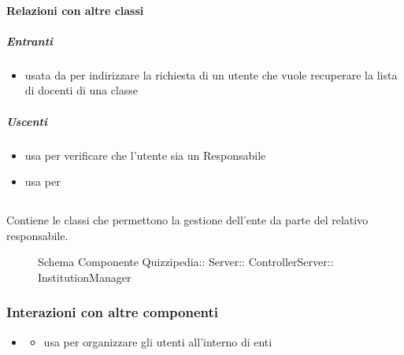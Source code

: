 \paragraph{Relazioni con altre classi}
\subparagraph{Entranti}
\begin{itemize}
\item usata da  per indirizzare la richiesta di un utente che vuole recuperare la lista di docenti di una classe
\end{itemize}
\subparagraph{Uscenti}
\begin{itemize}
\item usa  per verificare che l'utente sia un Responsabile
\item usa  per 
\end{itemize}
\subsection{}
Contiene le classi che permettono la gestione dell'ente da parte del relativo responsabile.
\begin{figure}[H]
\centering
\noindent{}
\caption[Schema Componente InstitutionManager]{Schema Componente Quizzipedia:: Server:: ControllerServer:: InstitutionManager}
\end{figure}
\subsubsection{Interazioni con altre componenti}
\begin{itemize}
\item {}
\begin{itemize}
\item usa  per organizzare gli utenti all'interno di enti
\end{itemize}
\end{itemize}
